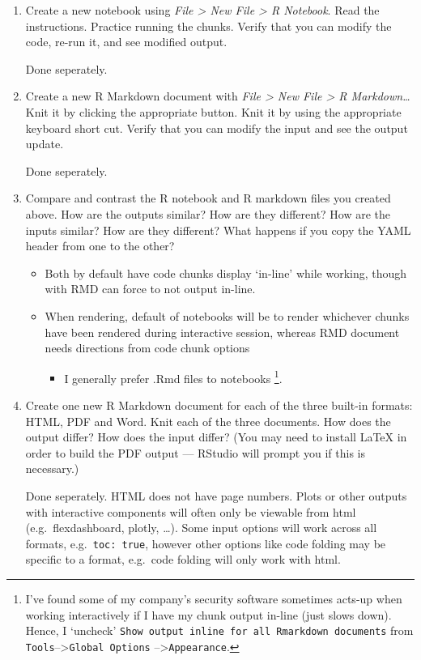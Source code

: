 \documentclass[]{book}
\providecommand{\tightlist}{%
  \setlength{\itemsep}{0pt}\setlength{\parskip}{0pt}}
\let\rmarkdownfootnote\footnote%
\def\footnote{\protect\rmarkdownfootnote}
\theoremstyle{definition}
\theoremstyle{definition}
\theoremstyle{definition}
\theoremstyle{remark}
\begin{document}
\begin{enumerate}
\def\labelenumi{\arabic{enumi}.}
\item
  Create a new notebook using \emph{File \textgreater{} New File
  \textgreater{} R Notebook}. Read the instructions. Practice running
  the chunks. Verify that you can modify the code, re-run it, and see
  modified output.

  Done seperately.
\item
  Create a new R Markdown document with \emph{File \textgreater{} New
  File \textgreater{} R Markdown\ldots{}} Knit it by clicking the
  appropriate button. Knit it by using the appropriate keyboard short
  cut. Verify that you can modify the input and see the output update.

  Done seperately.
\item
  Compare and contrast the R notebook and R markdown files you created
  above. How are the outputs similar? How are they different? How are
  the inputs similar? How are they different? What happens if you copy
  the YAML header from one to the other?

  \begin{itemize}
  \tightlist
  \item
    Both by default have code chunks display `in-line' while working,
    though with RMD can force to not output in-line.
  \item
    When rendering, default of notebooks will be to render whichever
    chunks have been rendered during interactive session, whereas RMD
    document needs directions from code chunk options

    \begin{itemize}
    \tightlist
    \item
      I generally prefer .Rmd files to notebooks \footnote{I've found
        some of my company's security software sometimes acts-up when
        working interactively if I have my chunk output in-line (just
        slows down). Hence, I `uncheck'
        \texttt{Show\ output\ inline\ for\ all\ Rmarkdown\ documents}
        from \texttt{Tools}--\textgreater{}\texttt{Global\ Options}
        --\textgreater{}\texttt{Appearance}.}.
    \end{itemize}
  \end{itemize}
\item
  Create one new R Markdown document for each of the three built-in
  formats: HTML, PDF and Word. Knit each of the three documents. How
  does the output differ? How does the input differ? (You may need to
  install LaTeX in order to build the PDF output --- RStudio will prompt
  you if this is necessary.)

  Done seperately. HTML does not have page numbers. Plots or other
  outputs with interactive components will often only be viewable from
  html (e.g.~flexdashboard, plotly, \ldots{}). Some input options will
  work across all formats, e.g.~\texttt{toc:\ true}, however other
  options like code folding may be specific to a format, e.g.~code
  folding will only work with html.
\end{enumerate}
\end{document}
